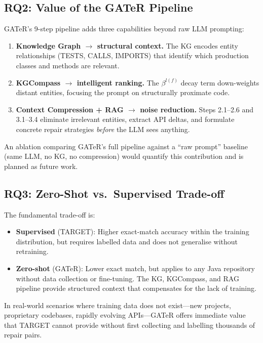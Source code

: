 \documentclass[conference,10pt]{IEEEtran}
\begin{document}
\subsection{RQ2: Value of the GATeR Pipeline}

GATeR's 9-step pipeline adds three capabilities beyond raw LLM
prompting:

\begin{enumerate}
    \item \textbf{Knowledge Graph $\to$ structural context.}
          The KG encodes entity relationships (TESTS, CALLS, IMPORTS)
          that identify which production classes and methods are relevant.
    \item \textbf{KGCompass $\to$ intelligent ranking.}
          The $\beta^{l(f)}$ decay term down-weights distant entities,
          focusing the prompt on structurally proximate code.
    \item \textbf{Context Compression + RAG $\to$ noise reduction.}
          Steps 2.1--2.6 and 3.1--3.4 eliminate irrelevant entities,
          extract API deltas, and formulate concrete repair strategies
          \emph{before} the LLM sees anything.
\end{enumerate}

An ablation comparing GATeR's full pipeline against a ``raw prompt''
baseline (same LLM, no KG, no compression) would quantify this
contribution and is planned as future work.

\subsection{RQ3: Zero-Shot vs.\ Supervised Trade-off}

The fundamental trade-off is:
\begin{itemize}
    \item \textbf{Supervised} (TARGET): Higher exact-match accuracy within
          the training distribution, but requires labelled data and does
          not generalise without retraining.
    \item \textbf{Zero-shot} (GATeR): Lower exact match, but applies to
          any Java repository without data collection or fine-tuning.
          The KG, KGCompass, and RAG pipeline provide structured context
          that compensates for the lack of training.
\end{itemize}

In real-world scenarios where training data does not exist---new
projects, proprietary codebases, rapidly evolving APIs---GATeR offers
immediate value that TARGET cannot provide without first collecting and
labelling thousands of repair pairs.
\end{document}
